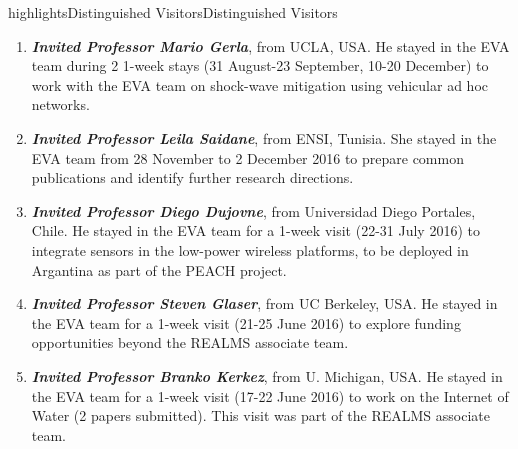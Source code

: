 \documentclass{ra2016}
\begin{document}
\begin{module}{highlights}{Distinguished Visitors}{Distinguished Visitors}

\begin{enumerate}
    \item \textit{\textbf{Invited Professor Mario Gerla}}, from UCLA, USA.
        He stayed in the EVA team during 2 1-week stays (31 August-23 September, 10-20 December) to work with the EVA team on shock-wave mitigation using vehicular ad hoc networks.
    \item \textit{\textbf{Invited Professor Leila Saidane}}, from ENSI, Tunisia.
        She stayed in the EVA team from 28 November to 2 December 2016 to prepare common publications and identify further research directions.
    \item \textit{\textbf{Invited Professor Diego Dujovne}}, from Universidad Diego Portales, Chile.
        He stayed in the EVA team for a 1-week visit (22-31 July 2016) to integrate sensors in the low-power wireless platforms, to be deployed in Argantina as part of the PEACH project.
    \item \textit{\textbf{Invited Professor Steven Glaser}}, from UC Berkeley, USA.
        He stayed in the EVA team for a 1-week visit (21-25 June 2016) to explore funding opportunities beyond the REALMS associate team.
    \item \textit{\textbf{Invited Professor Branko Kerkez}}, from U. Michigan, USA.
        He stayed in the EVA team for a 1-week visit (17-22 June 2016) to work on the Internet of Water (2 papers submitted).
        This visit was part of the REALMS associate team.
\end{enumerate} 

\end{module}

\end{document}
